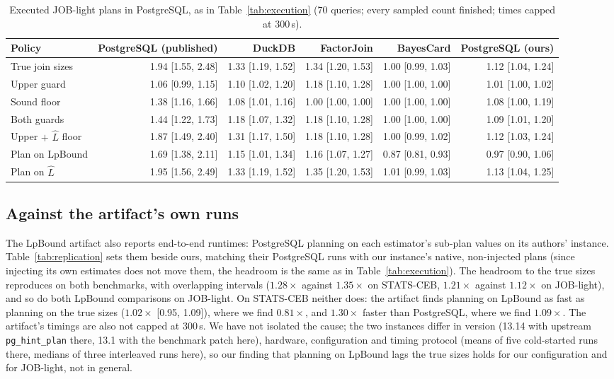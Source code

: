 \documentclass[sigconf, nonacm]{acmart}
\begin{document}
\begin{table}[t]
\centering
\caption{Executed JOB-light plans in PostgreSQL, as in
Table~\ref{tab:execution} (70 queries; every sampled count finished; times
capped at 300\,s).}
\label{tab:execution-jl}
\footnotesize
\setlength{\tabcolsep}{4pt}
\begin{tabular}{@{}lrrrrr@{}}
\toprule
Policy & PostgreSQL (published) & DuckDB & FactorJoin & BayesCard & PostgreSQL (ours) \\ \midrule
True join sizes & 1.94 [1.55, 2.48] & 1.33 [1.19, 1.52] & 1.34 [1.20, 1.53] & 1.00 [0.99, 1.03] & 1.12 [1.04, 1.24] \\
Upper guard & 1.06 [0.99, 1.15] & 1.10 [1.02, 1.20] & 1.18 [1.10, 1.28] & 1.00 [1.00, 1.00] & 1.01 [1.00, 1.02] \\
Sound floor & 1.38 [1.16, 1.66] & 1.08 [1.01, 1.16] & 1.00 [1.00, 1.00] & 1.00 [1.00, 1.00] & 1.08 [1.00, 1.19] \\
Both guards & 1.44 [1.22, 1.73] & 1.18 [1.07, 1.32] & 1.18 [1.10, 1.28] & 1.00 [1.00, 1.00] & 1.09 [1.01, 1.20] \\
Upper $+$ $\hat L$ floor & 1.87 [1.49, 2.40] & 1.31 [1.17, 1.50] & 1.18 [1.10, 1.28] & 1.00 [0.99, 1.02] & 1.12 [1.03, 1.24] \\
Plan on LpBound & 1.69 [1.38, 2.11] & 1.15 [1.01, 1.34] & 1.16 [1.07, 1.27] & 0.87 [0.81, 0.93] & 0.97 [0.90, 1.06] \\
Plan on $\hat L$ & 1.95 [1.56, 2.49] & 1.33 [1.19, 1.52] & 1.35 [1.20, 1.53] & 1.01 [0.99, 1.03] & 1.13 [1.04, 1.25] \\
\bottomrule
\end{tabular}
\end{table}
\subsection{Against the artifact's own runs}
\label{sec:replication}
The LpBound artifact also reports end-to-end runtimes: PostgreSQL planning on
each estimator's sub-plan values on its authors' instance.
Table~\ref{tab:replication} sets them beside ours, matching their PostgreSQL
runs with our instance's native, non-injected plans (since injecting its own
estimates does not move them, the headroom is the same as in
Table~\ref{tab:execution}). The headroom to the
true sizes reproduces on both benchmarks, with overlapping intervals
($1.28\times$ against $1.35\times$ on STATS-CEB, $1.21\times$ against
$1.12\times$ on JOB-light), and so do both LpBound comparisons on JOB-light.
On STATS-CEB neither does: the artifact finds planning on LpBound as fast as
planning on the true sizes ($1.02\times$ [0.95, 1.09]), where we find
$0.81\times$, and $1.30\times$ faster than PostgreSQL, where we find
$1.09\times$. The artifact's timings are also not capped at 300\,s. We have not isolated the cause; the
two instances differ in version (13.14 with upstream \texttt{pg\_hint\_plan}
there, 13.1 with the benchmark patch here), hardware, configuration and timing
protocol (means of five cold-started runs there, medians of three interleaved
runs here), so our finding that
planning on LpBound lags the true sizes holds for our configuration and for
JOB-light, not in general.
\end{document}

